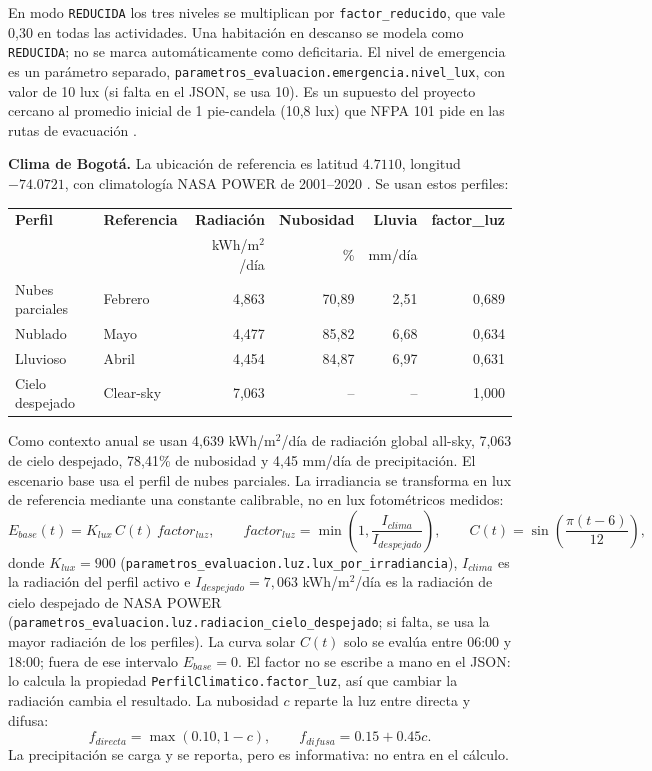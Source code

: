 \documentclass[12pt,a4paper]{article}
\newcommand{\estado}[1]{\texttt{#1}}
\newcommand{\codigo}[1]{\texttt{#1}}
\begin{document}
En modo \estado{REDUCIDA} los tres niveles se multiplican por \codigo{factor\_reducido}, que vale 0,30 en todas las actividades. Una habitación en descanso se modela como \estado{REDUCIDA}; no se marca automáticamente como deficitaria. El nivel de emergencia es un parámetro separado, \codigo{parametros\_evaluacion.emergencia.nivel\_lux}, con valor de 10 lux (si falta en el JSON, se usa 10). Es un supuesto del proyecto cercano al promedio inicial de 1 pie-candela (10,8 lux) que NFPA 101 pide en las rutas de evacuación \cite{nfpa101}.

\textbf{Clima de Bogotá.} La ubicación de referencia es latitud $4.7110$, longitud $-74.0721$, con climatología NASA POWER de 2001--2020 \cite{nasaPowerApi}. Se usan estos perfiles:

\begin{center}\small
\begin{tabular}{p{}p{}r r r r}
\toprule
\textbf{Perfil} & \textbf{Referencia} & \textbf{Radiación} & \textbf{Nubosidad} & \textbf{Lluvia} & \textbf{factor\_luz}\\
 & & kWh/m$^2$/día & \% & mm/día & \\
\midrule
Nubes parciales & Febrero & 4,863 & 70,89 & 2,51 & 0,689\\
Nublado & Mayo & 4,477 & 85,82 & 6,68 & 0,634\\
Lluvioso & Abril & 4,454 & 84,87 & 6,97 & 0,631\\
Cielo despejado & Clear-sky & 7,063 & -- & -- & 1,000\\
\bottomrule
\end{tabular}
\end{center}

Como contexto anual se usan 4,639 kWh/m$^2$/día de radiación global all-sky, 7,063 de cielo despejado, 78,41\% de nubosidad y 4,45 mm/día de precipitación. El escenario base usa el perfil de nubes parciales. La irradiancia se transforma en lux de referencia mediante una constante calibrable, no en lux fotométricos medidos:
\begin{equation}
 E_{base}(t)=K_{lux}\,C(t)\,factor_{luz},\qquad
 factor_{luz}=\min\left(1,\frac{I_{clima}}{I_{despejado}}\right),\qquad
 C(t)=\sin\left(\frac{\pi(t-6)}{12}\right),
 \label{eq:clima}
\end{equation}
donde $K_{lux}=900$ (\codigo{parametros\_evaluacion.luz.lux\_por\_irradiancia}), $I_{clima}$ es la radiación del perfil activo e $I_{despejado}=7,063$ kWh/m$^2$/día es la radiación de cielo despejado de NASA POWER (\codigo{parametros\_evaluacion.luz.radiacion\_cielo\_despejado}; si falta, se usa la mayor radiación de los perfiles). La curva solar $C(t)$ solo se evalúa entre 06:00 y 18:00; fuera de ese intervalo $E_{base}=0$. El factor no se escribe a mano en el JSON: lo calcula la propiedad \codigo{PerfilClimatico.factor\_luz}, así que cambiar la radiación cambia el resultado. La nubosidad $c$ reparte la luz entre directa y difusa:
\begin{equation}
 f_{directa}=\max(0.10,1-c),\qquad f_{difusa}=0.15+0.45c.
 \label{eq:nubosidad}
\end{equation}
La precipitación se carga y se reporta, pero es informativa: no entra en el cálculo.
\end{document}
